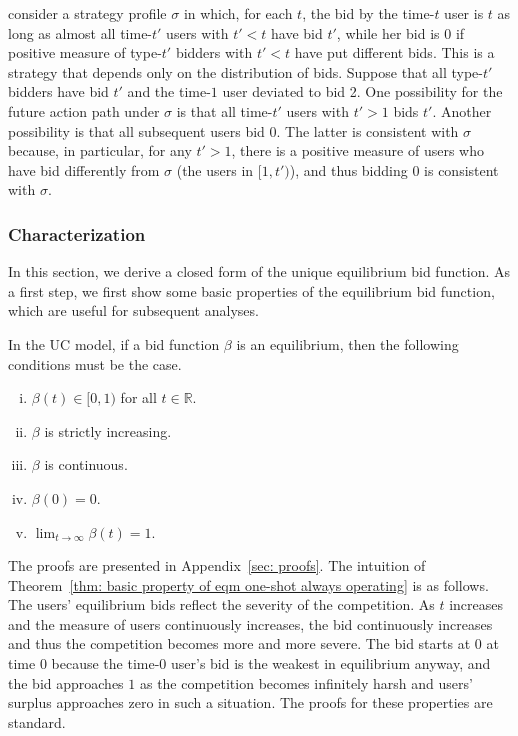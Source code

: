 \documentclass[12pt, letterpaper]{article}
\begin{document}
\begin{remark}
\begin{enumerate}
{consider a strategy profile $\sigma$ in which, for each $t$, the bid by the time-$t$ user is $t$ as long as almost all time-$t'$ users with $t'<t$ have bid $t'$, while her bid is 0 if positive measure of type-$t'$ bidders with $t'<t$ have put different bids. This is a strategy that depends only on the distribution of bids. Suppose that all type-$t'$ bidders have bid $t'$ and the time-$1$ user deviated to bid 2. One possibility for the future action path under $\sigma$ is that all time-$t'$ users with $t'>1$ bids $t'$. Another possibility is that all subsequent users bid $0$. The latter is consistent with $\sigma$ because, in particular, for any $t'>1$, there is a positive measure of users who have bid differently from $\sigma$ (the users in $[1,t')$), and thus bidding 0 is consistent with $\sigma$.}
\end{enumerate}
\end{remark}

\subsubsection{Characterization}

In this section, we derive a closed form of the unique equilibrium bid function. As a first step, we first show some basic properties of the equilibrium bid function, which are useful for subsequent analyses.

\begin{thm}\label{thm: basic property of eqm one-shot always operating}
    In the UC model, if a bid function $\beta$ is an equilibrium, then the following conditions must be the case.
    \begin{enumerate}[(i)]
        \item $\beta(t) \in [0, 1)$ for all $t \in \mathbb{R}$.
        \item $\beta$ is strictly increasing.
        \item $\beta$ is continuous.
        \item $\beta(0) = 0$.
        \item $\lim_{t \to \infty} \beta(t) = 1$.
    \end{enumerate}
\end{thm}

The proofs are presented in Appendix~\ref{sec: proofs}. The intuition of Theorem~\ref{thm: basic property of eqm one-shot always operating} is as follows. The users' equilibrium bids reflect the severity of the competition. As $t$ increases and the measure of users continuously increases, the bid continuously increases and thus the competition becomes more and more severe. The bid starts at $0$ at time $0$ because the time-$0$ user's bid is the weakest in equilibrium anyway, and the bid approaches $1$ as the competition becomes infinitely harsh and users' surplus approaches zero in such a situation. The proofs for these properties are standard.
\end{document}

